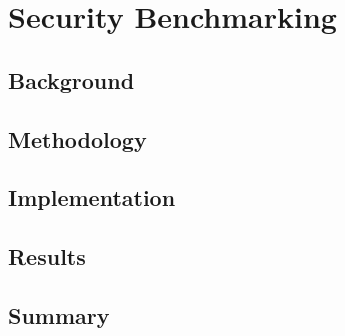 
\chapter{Security Benchmarking}\label{ch:benchmarking}



\section{Background}\label{sec:benchmark:background}



\section{Methodology}\label{sec:benhmark:methodology}




\section{Implementation}\label{sec:benhmark:implementation}



\section{Results}\label{sec:benhmark:results}




\section{Summary}\label{sec:benhmark:results}



